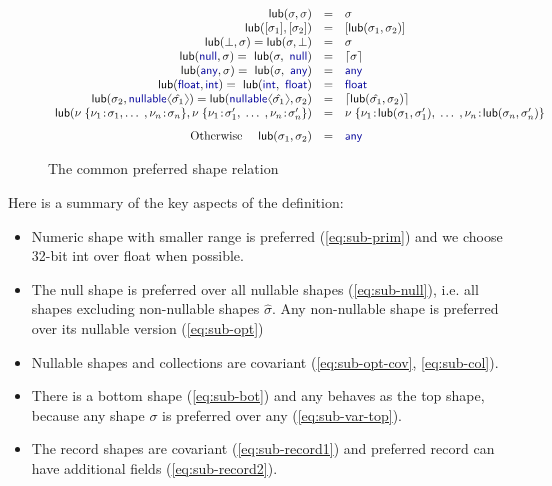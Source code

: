 \documentclass[10pt,preprint,clearpagebib]{sigplanconf}
\newcommand{\langl}{\begin{picture}(4.5,7)
\put(1.1,2.5){\rotatebox{60}{\line(1,0){5.5}}}
\put(1.1,2.5){\rotatebox{300}{\line(1,0){5.5}}}
\end{picture}}
\newcommand{\rangl}{\begin{picture}(4.5,7)
\put(.9,2.5){\rotatebox{120}{\line(1,0){5.5}}}
\put(.9,2.5){\rotatebox{240}{\line(1,0){5.5}}}
\end{picture}}
\newcommand{\kvd}[1]{\textnormal{\textcolor{kvdclr}{\sffamily #1}}}
\newcommand{\ident}[1]{\textnormal{\sffamily #1}}
\newcommand{\addopt}[1]{\lceil#1\rceil}
\begin{document}
\begin{figure}[t]
\begin{equation*}
\begin{array}{rcl}
\ident{lub}(\sigma, \sigma) &=& \sigma \\
\ident{lub}([\sigma_1], [\sigma_2]) &=& [\ident{lub}(\sigma_1, \sigma_2)]  \\
\ident{lub}(\bot, \sigma) = \ident{lub}(\sigma, \bot) &=& \sigma \\
\ident{lub}(\kvd{null}, \sigma) = \ident{lub}(\sigma, \kvd{null}) &=& \addopt{\sigma} \\
\ident{lub}(\kvd{any}, \sigma) = \ident{lub}(\sigma, \kvd{any}) &=& \kvd{any} \\
\ident{lub}(\kvd{float}, \kvd{int}) = \ident{lub}(\kvd{int}, \kvd{float}) &=& \kvd{float} \\
\ident{lub}(\sigma_2, \kvd{nullable}\langl \hat{\sigma_1} \rangl) = \ident{lub}(\kvd{nullable}\langl \hat{\sigma_1} \rangl, \sigma_2) &=& \addopt{\ident{lub}(\hat{\sigma_1}, \sigma_2)} \\
\ident{lub}(\nu \; \{ \nu_1 \!:\! \sigma_1,  \ldots \;, \nu_n \!:\! \sigma_n \}, 
  \nu \; \{ \nu_1 \!:\! \sigma'_1, \; \ldots \;, \nu_n \!:\! \sigma'_n \}) &=& 
  \nu \; \{ \nu_1 \!:\! \ident{lub}(\sigma_1, \sigma'_1), \; \ldots \; , \nu_n \!:\! \ident{lub}(\sigma_n, \sigma'_n) \}  \\[0.75em]
\textnormal{Otherwise}~~~~ \ident{lub}(\sigma_1, \sigma_2) &=& \kvd{any} \\
    
\end{array}
\end{equation*}

\caption{The common preferred shape relation}
\label{fig:subtyping-cst}
\end{figure}



\noindent
Here is a summary of the key aspects of the definition:
\begin{itemize}
\item Numeric shape with smaller range is preferred (\ref{eq:sub-prim}) and we choose 32-bit 
\ident{int} over \ident{float} when possible.

\item The \kvd{null} shape is preferred over all nullable shapes (\ref{eq:sub-null}), i.e. 
  all shapes excluding non-nullable shapes $\hat{\sigma}$. Any non-nullable shape is preferred
  over its nullable version (\ref{eq:sub-opt})
  
\item Nullable shapes and collections are 
  covariant (\ref{eq:sub-opt-cov}, \ref{eq:sub-col}).

\item There is a bottom shape (\ref{eq:sub-bot}) and \kvd{any} behaves as the top shape, because
  any shape $\sigma$ is preferred over \kvd{any} (\ref{eq:sub-var-top}). 

\item The record shapes are covariant (\ref{eq:sub-record1}) and preferred record can have 
  additional fields (\ref{eq:sub-record2}). 
\end{itemize}
\end{document}
